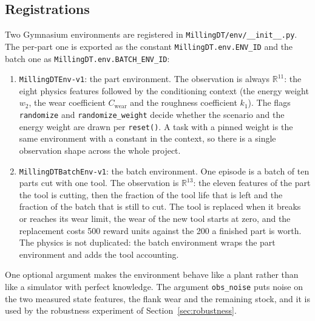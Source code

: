 \documentclass[11pt,a4paper]{article}
\newcommand{\R}{\mathbb{R}}
\begin{document}
\subsection{Registrations}
Two Gymnasium environments are registered in \texttt{MillingDT/\allowbreak env/\_\_init\_\_.py}. The per-part one is exported as the constant \texttt{MillingDT.env.ENV\_ID} and the batch one as \texttt{MillingDT.env.BATCH\_ENV\_ID}:

\begin{enumerate}
    \item \texttt{MillingDTEnv-v1}: the part environment. The observation is always $\R^{11}$: the eight physics features followed by the conditioning context (the energy weight $w_2$, the wear coefficient $C_\text{wear}$ and the roughness coefficient $k_1$). The flags \texttt{randomize} and \texttt{randomize\_weight} decide whether the scenario and the energy weight are drawn per \texttt{reset()}. A task with a pinned weight is the same environment with a constant in the context, so there is a single observation shape across the whole project.
    \item \texttt{MillingDTBatchEnv-v1}: the batch environment. One episode is a batch of ten parts cut with one tool. The observation is $\R^{13}$: the eleven features of the part the tool is cutting, then the fraction of the tool life that is left and the fraction of the batch that is still to cut. The tool is replaced when it breaks or reaches its wear limit, the wear of the new tool starts at zero, and the replacement costs 500 reward units against the 200 a finished part is worth. The physics is not duplicated: the batch environment wraps the part environment and adds the tool accounting.
\end{enumerate}

One optional argument makes the environment behave like a plant rather than like a simulator with perfect knowledge. The argument \texttt{obs\_noise} puts noise on the two measured state features, the flank wear and the remaining stock, and it is used by the robustness experiment of Section~\ref{sec:robustness}.
\end{document}
